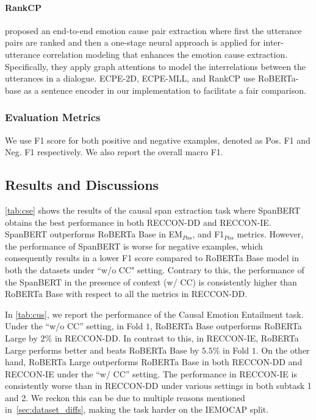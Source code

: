 \documentclass[smallextended]{svjour3}
\newcommand\RECCONDADD{RECCON-DD}
\newcommand\RECCONDAIE{RECCON-IE}
\newcommand\0{\hphantom{0}}
\begin{document}
\paragraph{RankCP}
\citet{wei-etal-2020-effective} proposed an end-to-end emotion cause pair extraction where first the utterance pairs are ranked and then a one-stage neural approach is applied for inter-utterance correlation modeling that enhances the emotion cause extraction. Specifically, they apply graph attentions to model the interrelations between the
utterances in a dialogue.
ECPE-2D, ECPE-MLL, and RankCP use RoBERTa-base as a sentence encoder in our implementation to facilitate a fair comparison.

\subsubsection{Evaluation Metrics}
We use F1 score for both positive and negative examples, denoted as Pos. F1 and Neg. F1 respectively. We also report the overall macro F1.

\subsection{Results and Discussions}
\label{sec:results}
\cref{tab:cse} shows the 
results of the causal span extraction task where SpanBERT obtains the best performance in both \RECCONDADD{} and \RECCONDAIE{}. SpanBERT outperforms RoBERTa Base in EM$_{Pos}$, and F1$_{Pos}$ metrics. However, the performance of SpanBERT is worse for negative examples, which consequently results in a lower F1 score compared to RoBERTa Base model in both the datasets under ``w/o CC" setting. Contrary to this, the performance of the SpanBERT in the presence of context (w/ CC) is consistently higher than RoBERTa Base with respect to all the metrics in \RECCONDADD{}.


In \cref{tab:cus}, we report the performance of the Causal Emotion Entailment task. Under the ``w/o CC'' setting, in Fold $1$, RoBERTa Base outperforms RoBERTa Large by $2$\% in \RECCONDADD{}. In contrast to this, in \RECCONDAIE{}, RoBERTa Large performs better and beats RoBERTa Base by $5.5$\% in Fold $1$. On the other hand, RoBERTa Large outperforms RoBERTa Base in both \RECCONDADD{} and \RECCONDAIE{} under the ``w/ CC'' setting. The performance in \RECCONDAIE{} is consistently worse than in \RECCONDADD{} under various settings in both subtask 1 and 2. We reckon this can be due to multiple reasons mentioned in~\cref{sec:dataset_diffs}, making the task harder on the IEMOCAP split.
\end{document}
